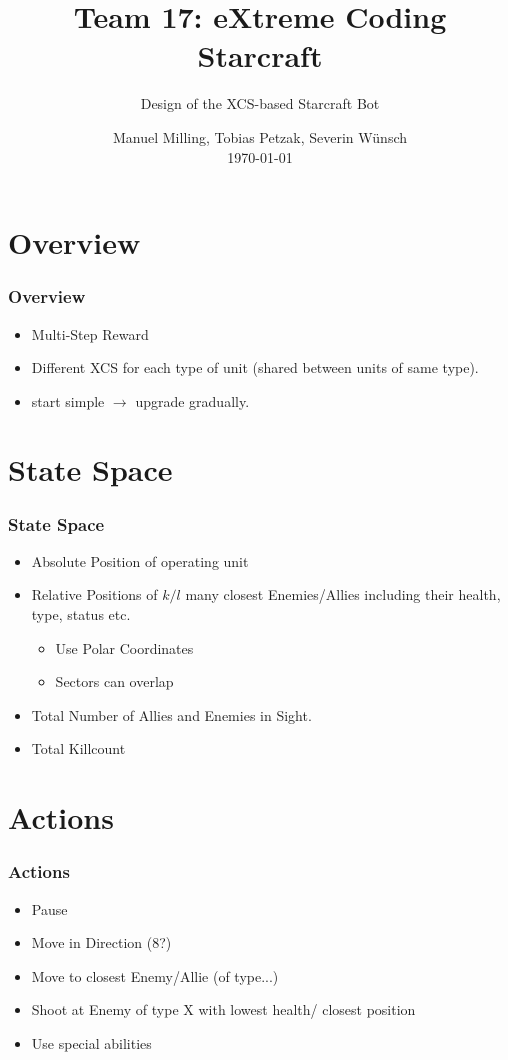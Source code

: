 \documentclass[ignorenonframetext]{beamer}
\title[Team XCS Presentation]{Team 17: eXtreme Coding Starcraft}
\subtitle[]{Design of the XCS-based Starcraft Bot}
\author[Milling, Petzak, Wünsch]{\large{Manuel Milling, Tobias Petzak, Severin Wünsch} \\
\tiny{\today} }
\institute[University of Augsburg]{Faculty of Applied Computer Science, University of Augsburg}
\date[14. October 2015]
\begin{document}
\frame[plain]{\titlepage}
\frame{\tableofcontents}

\section{Overview}
\begin{frame}
\frametitle{Overview}
\begin{itemize}
\item Multi-Step Reward
\item Different XCS for each type of unit (shared between units of same type).
\item start simple $\rightarrow$ upgrade gradually.
\end{itemize}
\end{frame}

\section{State Space}

\begin{frame}
\frametitle{State Space}
\begin{itemize}
\item Absolute Position of operating unit
\item Relative Positions of $k/l$ many closest Enemies/Allies including their health, type, status etc.
\begin{itemize}
\item Use Polar Coordinates
\item Sectors can overlap
\end{itemize}
\item Total Number of Allies and Enemies in Sight.
\item Total Killcount
\end{itemize}
\end{frame}

\section{Actions}

\begin{frame}
\frametitle{Actions}
\begin{itemize}
\item Pause
\item Move in Direction (8?)
\item Move to closest Enemy/Allie (of type...)
\item Shoot at Enemy of type X with lowest health/ closest position
\item Use special abilities
\end{itemize}
\end{frame}
\end{document}
